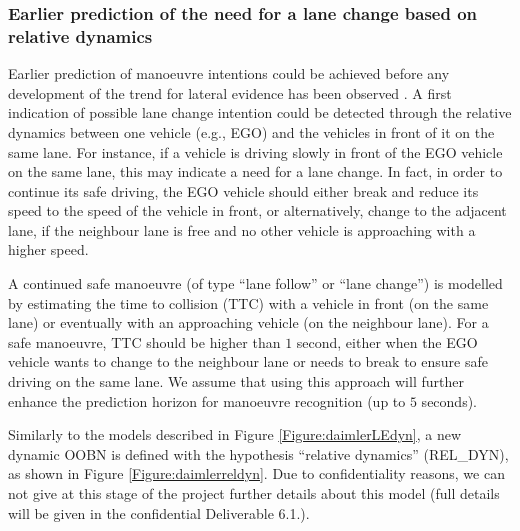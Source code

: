 \subsubsection{Earlier prediction of the need for a lane change based on relative dynamics}

Earlier prediction of manoeuvre intentions could be achieved before any development of the trend for lateral evidence has been observed \cite{SlavaThesis2014}. A first indication of possible lane change intention could be detected through the relative dynamics between one vehicle (e.g., EGO) and the vehicles in front of it on the same lane. For instance, if a vehicle is driving slowly in front of the EGO vehicle on the same lane, this may indicate a need for a lane change. In fact, in order to continue its safe driving, the EGO vehicle should either break and reduce its speed to the speed of the vehicle in front, or alternatively, change to the adjacent lane, if the neighbour lane is free and no other vehicle is approaching with a higher speed. 

A continued safe manoeuvre (of type ``lane follow'' or ``lane change'') is modelled by estimating the time to collision (TTC) with a vehicle in front (on the same lane) or eventually with an approaching vehicle (on the neighbour lane). For a safe manoeuvre, TTC should be higher than $1$ second, either when the EGO vehicle wants to change to the neighbour lane or needs to break to ensure safe driving on the same lane. We assume that using this approach will further enhance the prediction horizon for manoeuvre recognition (up to $5$ seconds).

Similarly to the models described in Figure \ref{Figure:daimlerLEdyn}, a new dynamic OOBN is defined with the hypothesis ``relative dynamics'' (REL\_DYN), as shown in Figure \ref{Figure:daimlerreldyn}.  Due to confidentiality reasons, we can not give at this stage of the project further details about this model (full details will be given in the confidential Deliverable 6.1.).

 
